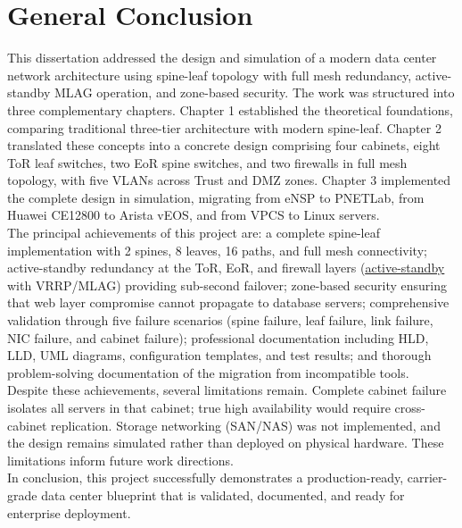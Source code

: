 \chapter*{General Conclusion}

This dissertation addressed the design and simulation of a modern data center network architecture using spine-leaf topology with full mesh redundancy, active-standby MLAG operation, and zone-based security. The work was structured into three complementary chapters. Chapter 1 established the theoretical foundations, comparing traditional three-tier architecture with modern spine-leaf. Chapter 2 translated these concepts into a concrete design comprising four cabinets, eight ToR leaf switches, two EoR spine switches, and two firewalls in full mesh topology, with five VLANs across Trust and DMZ zones. Chapter 3 implemented the complete design in simulation, migrating from eNSP to PNETLab, from Huawei CE12800 to Arista vEOS, and from VPCS to Linux servers.\\
The principal achievements of this project are: a complete spine-leaf implementation with 2 spines, 8 leaves, 16 paths, and full mesh connectivity; active-standby redundancy at the ToR, EoR, and firewall layers (\hyperref[def:activestandby]{\underline{active-standby}} with VRRP/MLAG) providing sub-second failover; zone-based security ensuring that web layer compromise cannot propagate to database servers; comprehensive validation through five failure scenarios (spine failure, leaf failure, link failure, NIC failure, and cabinet failure); professional documentation including HLD, LLD, UML diagrams, configuration templates, and test results; and thorough problem-solving documentation of the migration from incompatible tools.\\
Despite these achievements, several limitations remain. Complete cabinet failure isolates all servers in that cabinet; true high availability would require cross-cabinet replication. Storage networking (SAN/NAS) was not implemented, and the design remains simulated rather than deployed on physical hardware. These limitations inform future work directions.\\
In conclusion, this project successfully demonstrates a production-ready, carrier-grade data center blueprint that is validated, documented, and ready for enterprise deployment.